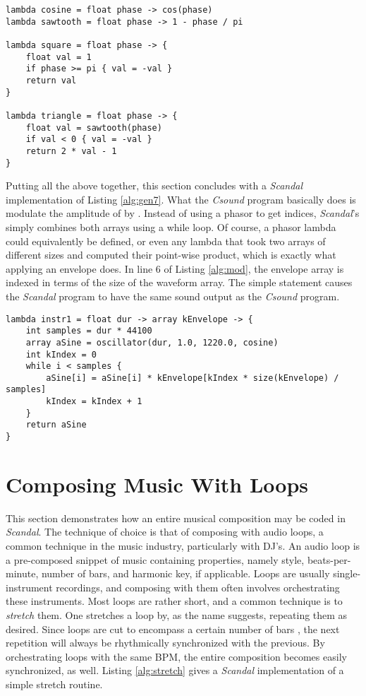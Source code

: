 \begin{lstlisting}[emph={lambda,float,cos,pi,if,return},emphstyle={\textbf},caption={Waveform-generating lambdas.},label={alg:waveforms}]
lambda cosine = float phase -> cos(phase)
lambda sawtooth = float phase -> 1 - phase / pi

lambda square = float phase -> {
	float val = 1
	if phase >= pi { val = -val }
	return val
}

lambda triangle = float phase -> {
	float val = sawtooth(phase)
	if val < 0 { val = -val }
	return 2 * val - 1
}
\end{lstlisting}

Putting all the above together, this section concludes with a \emph{Scandal} implementation of Listing \ref{alg:gen7}. What the \emph{Csound} program basically does is modulate the amplitude of  by . Instead of using a phasor to get indices, \emph{Scandal}'s  simply combines both arrays using a while loop. Of course, a phasor lambda could equivalently be defined, or even any lambda that took two arrays of different sizes and computed their point-wise product, which is exactly what applying an envelope does. In line 6 of Listing \ref{alg:mod}, the envelope array is indexed in terms of the size of the waveform array. The simple statement  causes the \emph{Scandal} program to have the same sound output as the \emph{Csound} program.

\begin{lstlisting}[emph={lambda,float,array,int,while,return},emphstyle={\textbf},caption={Implementing a \emph{Csound} program in \emph{Scandal}.},label={alg:mod}]
lambda instr1 = float dur -> array kEnvelope -> {
	int samples = dur * 44100
	array aSine = oscillator(dur, 1.0, 1220.0, cosine)
	int kIndex = 0
	while i < samples {
		aSine[i] = aSine[i] * kEnvelope[kIndex * size(kEnvelope) / samples]
		kIndex = kIndex + 1
	}
	return aSine
}
\end{lstlisting}

\section{Composing Music With Loops}

This section demonstrates how an entire musical composition may be coded in \emph{Scandal}. The technique of choice is that of composing with audio loops, a common technique in the music industry, particularly with DJ's. An audio loop is a pre-composed snippet of music containing properties, namely style, beats-per-minute, number of bars, and harmonic key, if applicable. Loops are usually single-instrument recordings, and composing with them often involves orchestrating these instruments. Most loops are rather short, and a common technique is to \emph{stretch} them. One stretches a loop by, as the name suggests, repeating them as desired. Since loops are cut to encompass a certain number of bars , the next repetition will always be rhythmically synchronized with the previous. By orchestrating loops with the same BPM, the entire composition becomes easily synchronized, as well. Listing \ref{alg:stretch} gives a \emph{Scandal} implementation of a simple stretch routine.

